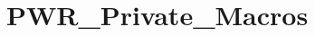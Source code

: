 \hypertarget{group___p_w_r___private___macros}{}\section{P\+W\+R\+\_\+\+Private\+\_\+\+Macros}
\label{group___p_w_r___private___macros}
